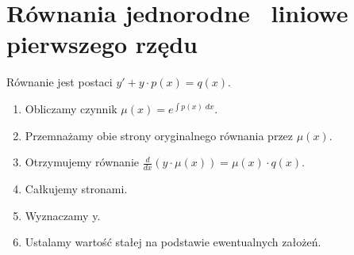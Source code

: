 \section{Równania jednorodne \ liniowe pierwszego rzędu}
Równanie jest postaci \( y' + y \cdot p(x) = q(x) \).
\begin{enumerate}
	\onehalfspacing
	\item Obliczamy czynnik \( \mu(x) = e^{\int p(x) \;dx} \).
	\item Przemnażamy obie strony oryginalnego równania przez \( \mu(x) \).
	\item Otrzymujemy równanie \( \frac{d}{dx}\left(y \cdot \mu(x)\right) = \mu(x) \cdot q(x) \).
	\item Całkujemy stronami.
	\item Wyznaczamy y.
	\item Ustalamy wartość stałej na podstawie ewentualnych założeń.
\end{enumerate}